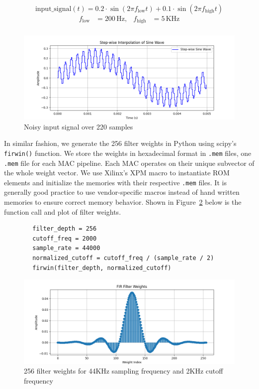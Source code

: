 \documentclass{article}
\begin{document}
    \begin{equation}
        \text{input\_signal}(t) = 0.2 \cdot \sin(2 \pi f_{\text{low}} t)
        + 0.1 \cdot \sin(2 \pi f_{\text{high}} t)
        \label{eq:sine}
    \end{equation}
    \[
    \begin{aligned}
        f_{\text{low}} &= 200 \, \text{Hz}, & f_{\text{high}} &= 5 \, \text{KHz} \\
    \end{aligned}
    \]
    \begin{figure}
        \centering
        \includegraphics[width=1.00\textwidth]{figures/sine.png}
        \caption{Noisy input signal over 220 samples}\label{fig:sine}
    \end{figure}

    In similar fashion, we generate the 256 filter weights in Python using scipy's \texttt{firwin()} function.
    We store the weights in hexadecimal format in \texttt{.mem} files, one \texttt{.mem} file for each MAC pipeline.
    Each MAC operates on their unique subvector of the whole weight vector.
    We use Xilinx's XPM macro to instantiate ROM elements and initialize the memories with their respective \texttt{.mem} files.
    It is generally good practice to use vendor-specific macros instead of hand written memories to ensure correct memory behavior.
    Shown in Figure~\ref{fig:weights} below is the function call and plot of filter weights.

    \begin{verbatim}
        filter_depth = 256
        cutoff_freq = 2000
        sample_rate = 44000
        normalized_cutoff = cutoff_freq / (sample_rate / 2)
        firwin(filter_depth, normalized_cutoff)
    \end{verbatim}
    \begin{figure}
        \centering
        \includegraphics[width=1.00\textwidth]{figures/fir_coeff.png}
        \caption{256 filter weights for 44KHz sampling frequency and 2KHz cutoff frequency}\label{fig:weights}
    \end{figure}
\end{document}
